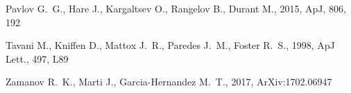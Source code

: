 \documentclass[usenatbib]{mn2e}
\newcommand{\apj}{ApJ}
\newcommand{\apjl}{ApJ Lett.}
\begin{document}
\begin{thebibliography}{}
{Pavlov} G.~G.,  {Hare} J.,  {Kargaltsev} O.,  {Rangelov} B.,    {Durant} M.,
  2015, \apj, 806, 192

{Tavani} M.,  {Kniffen} D.,  {Mattox} J.~R.,  {Paredes} J.~M.,    {Foster}
  R.~S.,  1998, \apjl, 497, L89

{Zamanov} R.~K.,  {Marti} J.,    {Garcia-Hernandez} M.~T.,  2017,
  ArXiv:1702.06947

\end{thebibliography}
\end{document}
